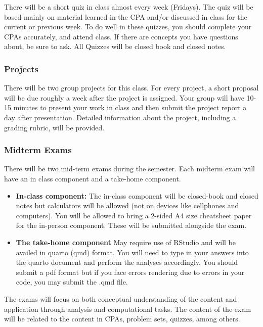 \documentclass[
  letterpaper,
  DIV=11,
  numbers=noendperiod]{scrartcl}
\begin{document}
There will be a short quiz in class almost every week (Fridays). The
quiz will be based mainly on material learned in the CPA and/or
discussed in class for the current or previous week. To do well in these
quizzes, you should complete your CPAs accurately, and attend class. If
there are concepts you have questions about, be sure to ask. All Quizzes
will be closed book and closed notes.

\subsubsection{Projects}\label{projects}

There will be two group projects for this class. For every project, a
short proposal will be due roughly a week after the project is assigned.
Your group will have 10-15 minutes to present your work in class and
then submit the project report a day after presentation. Detailed
information about the project, including a grading rubric, will be
provided.

\subsubsection{Midterm Exams}\label{midterm-exams}

There will be two mid-term exams during the semester. Each midterm exam
will have an in class component and a take-home component.

\begin{itemize}
\item
  \textbf{In-class component:} The in-class component will be
  closed-book and closed notes but calculators will be allowed (not on
  devices like cellphones and computers). You will be allowed to bring a
  2-sided A4 size cheatsheet paper for the in-person component. These
  will be submitted alongside the exam.
\item
  \textbf{The take-home component} May require use of RStudio and will
  be availed in quarto (qmd) format. You will need to type in your
  answers into the quarto document and perform the analyses accordingly.
  You should submit a pdf format but if you face errors rendering due to
  errors in your code, you may submit the .qmd file.
\end{itemize}

The exams will focus on both conceptual understanding of the content and
application through analysis and computational tasks. The content of the
exam will be related to the content in CPAs, problem sets, quizzes,
among others.
\end{document}
